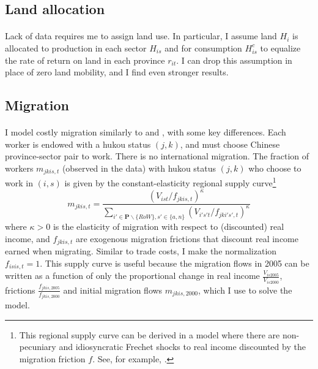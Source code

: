 \documentclass[]{article}
\theoremstyle{plain}
\begin{document}
\subsection*{Land allocation}
\paragraph*{}
Lack of data requires me to assign land use. In particular, I assume land $H_{i}$ is allocated to production in each sector $H_{is}$ and for consumption $H^{c}_{is}$ to equalize the rate of return on land in each province $r_{it}$. I can drop this assumption in place of zero land mobility, and I find even stronger results.
\subsection*{Migration}
\paragraph*{}
I model costly migration similarly to \cite{tombezhu} and \cite{hao2020}, with some key differences. Each worker is endowed with a hukou status $(j, k)$, and must choose Chinese province-sector pair to work. There is no international migration. The fraction of workers $m_{jkis, t}$ (observed in the data) with hukou status $(j, k)$ who choose to work in $(i, s)$ is given by the constant-elasticity regional supply curve\footnote{This regional supply curve can be derived in a model where there are non-pecuniary and idiosyncratic Frechet shocks to real income discounted by the migration friction $f$. See, for example, \cite{redding2016}.}
\begin{equation}\label{laboursupply}
	m_{jkis, t} = \frac{(V_{ist}/f_{jkis,t})^{\kappa}}{\sum_{i' \in \mathbf{P} \backslash \{RoW\}, s'\in \{a, n\}}(V_{i's't}/f_{jki's',t})^{\kappa}}
\end{equation}
where $\kappa > 0$ is the elasticity of migration with respect to (discounted) real income, and $f_{jkis, t}$ are exogenous migration frictions that discount real income earned when migrating. Similar to trade costs, I make the normalization $f_{isis, t} = 1$. This supply curve is useful because the migration flows in 2005 can be written as a function of only the proportional change in real income $\frac{V_{is2005}}{V_{is2000}}$, frictions $\frac{f_{jkis, 2005}}{f_{jkis, 2000}}$ and initial migration flows $m_{jkis,2000}$, which I use to solve the model.  
\end{document}
